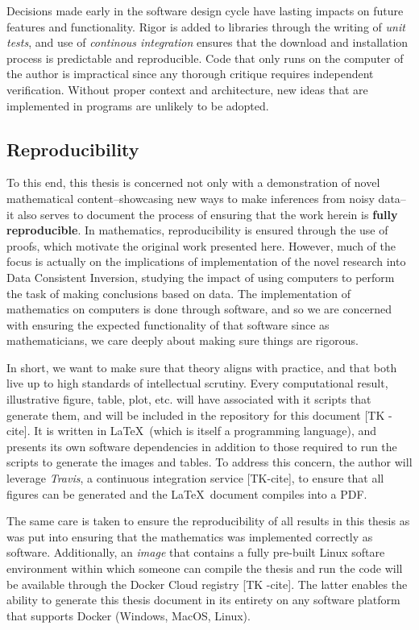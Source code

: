 Decisions made early in the software design cycle have lasting impacts on future features and functionality.
Rigor is added to libraries through the writing of \emph{unit tests}, and use of \emph{continous integration} ensures that the download and installation process is predictable and reproducible. 
Code that only runs on the computer of the author is impractical since any thorough critique requires independent verification.
Without proper context and architecture, new ideas that are implemented in programs are unlikely to be adopted.

\subsection{Reproducibility}
To this end, this thesis is concerned not only with a demonstration of novel mathematical content\---showcasing new ways to make inferences from noisy data\---it also serves to document the process of ensuring that the work herein is \textbf{fully reproducible}.
In mathematics, reproducibility is ensured through the use of proofs, which motivate the original work presented here.
However, much of the focus is actually on the implications of implementation of the novel research into Data Consistent Inversion, studying the impact of using computers to perform the task of making conclusions based on data.
The implementation of mathematics on computers is done through software, and so we are concerned with ensuring the expected functionality of that software since as mathematicians, we care deeply about making sure things are rigorous. 

In short, we want to make sure that theory aligns with practice, and that both live up to high standards of intellectual scrutiny. 
Every computational result, illustrative figure, table, plot, etc. will have associated with it scripts that generate them, and will be included in the  repository for this document [TK - cite]. 
It is written in \LaTeX\, (which is itself a programming language), and presents its own software dependencies in addition to those required to run the scripts to generate the images and tables. 
To address this concern, the author will leverage \emph{Travis}, a continuous integration service [TK-cite], to ensure that all figures can be generated and the \LaTeX\, document compiles into a PDF.

The same care is taken to ensure the reproducibility of all results in this thesis as was put into ensuring that the mathematics was implemented correctly as software. 
Additionally, an \emph{image} that contains a fully pre-built Linux softare environment within which someone can compile the thesis and run the code will be available through the Docker Cloud registry [TK -cite]. 
The latter enables the ability to generate this thesis document in its entirety on any software platform that supports Docker (Windows, MacOS, Linux).


